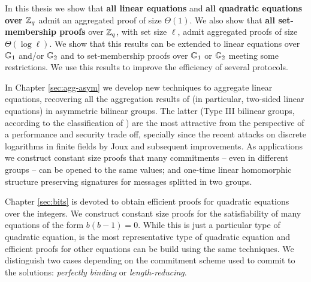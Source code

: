 In this thesis we show that \textbf{all linear equations} and \textbf{all quadratic equations over $\mathbb{Z}_q$} admit an aggregated proof of size $\Theta(1)$. We also show that \textbf{all set-membership proofs} over $\mathbb{Z}_q$, with set size $\ell$, admit aggregated proofs of size $\Theta(\log \ell)$. We show that this results can be extended to linear equations over $\mathbb{G}_1$ and/or $\mathbb{G}_2$ and to set-membership proofs over $\mathbb{G}_1$ or $\mathbb{G}_2$ meeting some restrictions. We use this results to improve the efficiency of several protocols. 



In Chapter \ref{sec:agg-asym} we develop new techniques to aggregate linear equations, recovering all the aggregation results of \cite{C:JutRoy14} (in particular, two-sided linear equations) in asymmetric bilinear groups. The latter (Type III bilinear groups, according to the classification of \cite{DAM:GalPatSma08}) are the most 
attractive 
from the perspective of a performance and security trade off, specially since the recent attacks on discrete logarithms in finite fields by Joux \cite{SAC:Joux13} and subsequent improvements. As applications we construct constant size proofs that many commitments -- even in different groups -- can be opened to the same values; and one-time linear homomorphic structure preserving signatures for messages splitted in two groups.

Chapter \ref{sec:bits} is devoted to obtain efficient proofs for quadratic equations over the integers. We construct constant size proofs for the satisfiability of many equations of the form $b(b-1)=0$. While this is just a particular type of quadratic equation, is the most representative type of quadratic equation and efficient proofs for other equations can be build using the same techniques. We distinguish two cases depending on the commitment scheme used to commit to the solutions: \emph{perfectly binding} or \emph{length-reducing}. 

